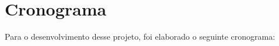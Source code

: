 \chapter[Cronograma]{Cronograma}
\label{cap:cronograma}

Para o desenvolvimento desse projeto, foi elaborado o seguinte cronograma:

